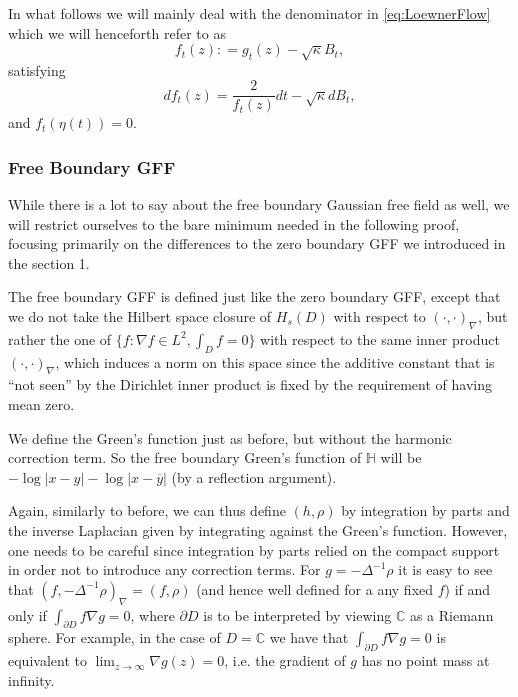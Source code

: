 \documentclass[11pt,reqno]{amsart}
\numberwithin{equation}{section}
\newcommand{\deq}{\mathrel{\mathop:}=}
\begin{document}
In what follows we will mainly deal with the denominator in \eqref{eq:LoewnerFlow} which we will henceforth refer to as $$f_t(z)\deq g_t(z)-\sqrt{\kappa}B_t,$$ satisfying $$df_t(z)=\frac{2}{f_t(z)}dt-\sqrt\kappa dB_t,$$ and $f_t(\eta(t))=0$.


\subsubsection{Free Boundary GFF}
While there is a lot to say about the free boundary Gaussian free field as well, we will restrict ourselves to the bare minimum needed in the following proof, focusing primarily on the differences to the zero boundary GFF we introduced in the section 1.

The free boundary GFF is defined just like the zero boundary GFF, except that we do not take the Hilbert space closure of $H_s(D)$ with respect to $(\cdot,\cdot)_\nabla$, but rather the one of $\{f:\nabla f\in L^2,\int_D f=0\}$ with respect to the same inner product $(\cdot,\cdot)_\nabla$, which induces a norm on this space since the additive constant that is ``not seen'' by the Dirichlet inner product is fixed by the requirement of having mean zero.

We define the Green's function just as before, but without the harmonic correction term. So the free boundary Green's function of $\mathbb H$ will be $-\log|x-y|-\log|x-\overline y|$ (by a reflection argument).

Again, similarly to before, we can thus define $(h,\rho)$ by integration by parts and the inverse Laplacian given by integrating against the Green's function. However, one needs to be careful since integration by parts relied on the compact support in order not to introduce any correction terms. For $g=-\Delta^{-1}\rho$ it is easy to see that $(f,-\Delta^{-1}\rho)_\nabla=(f,\rho)$ (and hence well defined for a any fixed $f$) if and only if $\int_{\partial D}f\nabla g=0$, where $\partial D$ is to be interpreted by viewing $\mathbb C$ as a Riemann sphere. For example, in the case of $D=\mathbb C$ we have that $\int_{\partial D}f\nabla g=0$ is equivalent to $\lim_{z\rightarrow\infty}\nabla g(z)=0$, i.e. the gradient of $g$ has no point mass at infinity.
\end{document}
